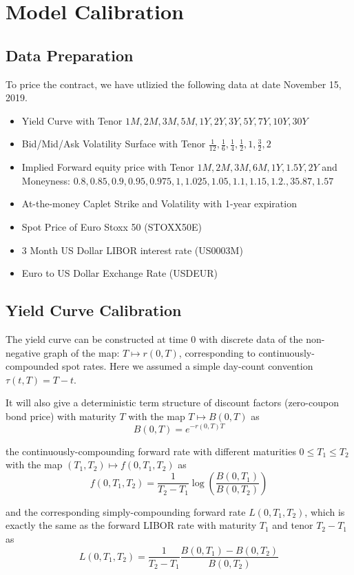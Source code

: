 \documentclass[11pt]{article}
\numberwithin{equation}{section}
\theoremstyle{remark}
\begin{document}
\section{Model Calibration}\label{3}
\subsection{Data Preparation}\label{3.1}

To price the contract, we have utlizied the following data at date November 15, 2019.

\begin{itemize}
\item Yield Curve with Tenor $1M, 2M, 3M, 5M, 1Y, 2Y, 3Y, 5Y, 7Y, 10Y, 30Y$
\item Bid/Mid/Ask Volatility Surface with Tenor $\frac{1}{12}, \frac{1}{6}, \frac{1}{4}, \frac{1}{2}, 1, \frac{3}{2}, 2$
\item Implied Forward equity price with Tenor $1M,2M,3M,6M,1Y,1.5Y,2Y$ and Moneyness: $0.8, 0.85, 0.9, 0.95, 0.975, 1, 1.025, 1.05, 1.1, 1.15, 1.2., 35.87, 1.57$
\item At-the-money Caplet Strike and Volatility with 1-year expiration
\item Spot Price of Euro Stoxx 50 (STOXX50E)
\item 3 Month US Dollar LIBOR interest rate (US0003M)
\item Euro to US Dollar Exchange Rate (USDEUR)
\end{itemize}

\subsection{Yield Curve Calibration}\label{3.2}
The yield curve can be constructed at time 0 with discrete data of the non-negative graph of the map: $T \mapsto r(0, T)$, corresponding to continuously-compounded spot rates. Here we assumed a simple day-count convention $\tau(t, T) = T-t$.

It will also give a deterministic term structure of discount factors (zero-coupon bond price) with maturity $T$ with the map $T \mapsto B(0, T)$ as
$$B(0, T) = e^{- r(0, T) T} $$

the continuously-compounding forward rate with different maturities $0 \leq T_1 \leq T_2$ with the map $ (T_1, T_2) \mapsto f(0, T_1, T_2)$ as
$$f(0,T_1,T_2) = \frac{1}{T_2-T_1} \log \left(\frac{B(0,T_1)}{B(0,T_2)}\right)$$

and the corresponding simply-compounding forward rate $L(0, T_1, T_2)$, which is exactly the same as the forward LIBOR rate with maturity $T_1$ and tenor $T_2-T_1$ as
$$L(0,T_1,T_2) = \frac{1}{T_2-T_1}\frac{B(0,T_1)-B(0,T_2)}{B(0,T_2)}$$
\end{document}
